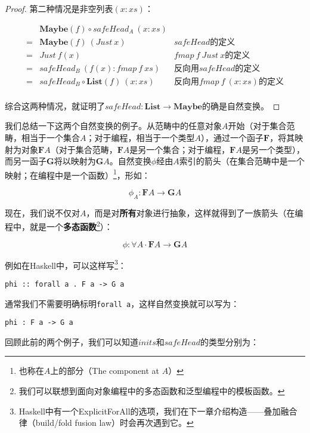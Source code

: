 \documentclass{article}
\begin{document}
\begin{example}
\begin{proof}
第二种情况是非空列表$(x:xs)$：

\[
\begin{array}{cll}
  & \mathbf{Maybe}(f) \circ safeHead_A\ (x:xs) & \\
= & \mathbf{Maybe}(f)\ (Just\ x) & \text{$safeHead$的定义} \\
= & Just\ f(x) & \text{$fmap\ f\ Just\ x$的定义} \\
= & safeHead_B\ (f(x) : fmap\ f\ xs) & \text{反向用$safeHead$的定义} \\
= & safeHead_B \circ \mathbf{List}(f)\ (x:xs) & \text{反向用$fmap\ f\ (x:xs)$的定义} \\
\end{array}
\]

综合这两种情况，就证明了$safeHead : \mathbf{List} \to \mathbf{Maybe}$的确是自然变换。
\end{proof}
\end{example}

我们总结一下这两个自然变换的例子。从范畴中的任意对象$A$开始（对于集合范畴，相当于一个集合$A$；对于编程，相当于一个类型$A$），通过一个函子$\mathbf{F}$，将其映射为对象$\mathbf{F}A$（对于集合范畴，$\mathbf{F}A$是另一个集合；对于编程，$\mathbf{F}A$是另一个类型），而另一函子$\mathbf{G}$将以映射为$\mathbf{G}A$。自然变换$\phi$经由$A$索引的箭头（在集合范畴中是一个映射；在编程中是一个函数）\footnote{也称在$A$上的部分（The component at $A$）}，形如：

\[
\phi_A : \mathbf{F} A \to \mathbf{G} A
\]

现在，我们说不仅对$A$，而是对\textbf{所有}对象进行抽象，这样就得到了一族箭头（在编程中，就是一个\textbf{多态函数}\footnote{我们可以联想到面向对象编程中的多态函数和泛型编程中的模板函数。}）：

\[
\phi : \forall A \cdot \mathbf{F} A \to \mathbf{G} A
\]

例如在Haskell中，可以这样写\footnote{Haskell中有一个ExplicitForAll的选项，我们在下一章介绍构造——叠加融合律（build/fold fusion law）时会再次遇到它。}：

\lstset{frame=single}
\begin{lstlisting}
phi :: forall a . F a -> G a
\end{lstlisting}

通常我们不需要明确标明\texttt{forall a}，这样自然变换就可以写为：

\begin{lstlisting}
phi : F a -> G a
\end{lstlisting}

回顾此前的两个例子，我们可以知道$inits$和$safeHead$的类型分别为：
\end{document}
